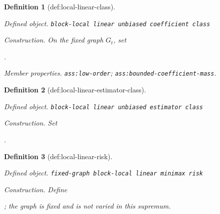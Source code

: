 \documentclass{article}
\newtheorem{definition}{Definition}
\begin{document}
\begin{definition}[def:local-linear-class]\label{def:local-linear-class}
\par\smallskip\noindent\emph{Defined object.} \texttt{block-\allowbreak{}local linear unbiased coefficient class}
\par\smallskip\noindent\emph{Construction.} On the fixed graph \(G_t\), set \par\noindent {}\par\noindent.
\par\smallskip\noindent\emph{Member properties.} \texttt{ass:\allowbreak{}low-\allowbreak{}order}; \texttt{ass:\allowbreak{}bounded-\allowbreak{}coefficient-\allowbreak{}mass}.
\end{definition}

\begin{definition}[def:local-linear-estimator-class]\label{def:local-linear-estimator-class}
\par\smallskip\noindent\emph{Defined object.} \texttt{block-\allowbreak{}local linear unbiased estimator class}
\par\smallskip\noindent\emph{Construction.} Set \par\noindent {}\par\noindent.
\end{definition}

\begin{definition}[def:local-linear-risk]\label{def:local-linear-risk}
\par\smallskip\noindent\emph{Defined object.} \texttt{fixed-\allowbreak{}graph block-\allowbreak{}local linear minimax risk}
\par\smallskip\noindent\emph{Construction.} Define \par\noindent {}\par\noindent; the graph is fixed and is not varied in this supremum.
\end{definition}
\end{document}
